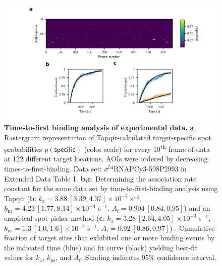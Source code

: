 \begin{figure}[t]
\centering
\includegraphics[width=\textwidth]{extended-data/figure6/figure6.png}
\caption{\textbf{Time-to-first binding analysis of experimental data.}  \textbf{a}, Rastergram representation of Tapqir-calculated target-specific spot  probabilities $p(\mathsf{specific})$ (color scale) for every 10\textsuperscript{th} frame of data at 122 different target locations.  AOIs were ordered by decreasing times-to-first-binding. Data set: $\sigma^{54}$RNAPCy3-598P2993 in Extended Data Table 1. \textbf{b,c}, Determining the association rate constant for the same data set by  time-to-first-binding analysis using Tapqir (\textbf{b}: $k_\mathrm{a} = 3.88 \: [3.39, 4.37] \times 10^{-3}$ s$^{-1}$, $k_\mathrm{ns} = 4.23 \: [1.77, 8.14] \times 10^{-4}$ s$^{-1}$, $A_\mathrm{f} = 0.904 \: [0.84, 0.95]$) and an empirical spot-picker method (\textbf{c}: $k_\mathrm{a} = 3.28 \: [2.64, 4.05] \times 10^{-3}$ s$^{-1}$, $k_\mathrm{ns} = 1.3 \: [1.0, 1.6] \times 10^{-4}$ s$^{-1}$, $A_\mathrm{f} = 0.92 \: [0.86, 0.97]$) \cite{Friedman2013-sf}. Cumulative fraction of target sites that exhibited one or more binding events by the indicated time (blue) and fit curve (black) yielding best-fit values for $k_\mathrm{a}$, $k_\mathrm{ns}$, and $A_\mathrm{f}$. Shading indicates 95\% confidence interval.
}
\label{fig:sigma54_298P2993}
\end{figure}
\clearpage
\pagebreak

